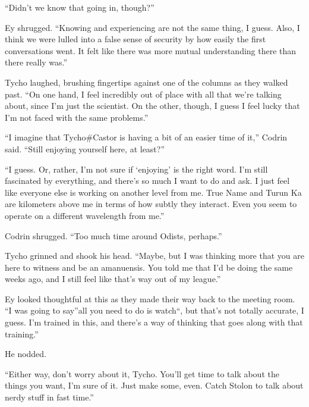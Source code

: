 ``Didn't we know that going in, though?''

Ey shrugged. ``Knowing and experiencing are not the same thing, I guess. Also, I think we were lulled into a false sense of security by how easily the first conversations went. It felt like there was more mutual understanding there than there really was.''

Tycho laughed, brushing fingertips against one of the columns as they walked past. ``On one hand, I feel incredibly out of place with all that we're talking about, since I'm just the scientist. On the other, though, I guess I feel lucky that I'm not faced with the same problems.''

``I imagine that Tycho\#Castor is having a bit of an easier time of it,'' Codrin said. ``Still enjoying yourself here, at least?''

``I guess. Or, rather, I'm not sure if `enjoying' is the right word. I'm still fascinated by everything, and there's so much I want to do and ask. I just feel like everyone else is working on another level from me. True Name and Turun Ka are kilometers above me in terms of how subtly they interact. Even you seem to operate on a different wavelength from me.''

Codrin shrugged. ``Too much time around Odists, perhaps.''

Tycho grinned and shook his head. ``Maybe, but I was thinking more that you are here to witness and be an amanuensis. You told me that I'd be doing the same weeks ago, and I still feel like that's way out of my league.''

Ey looked thoughtful at this as they made their way back to the meeting room. ``I was going to say''all you need to do is watch``, but that's not totally accurate, I guess. I'm trained in this, and there's a way of thinking that goes along with that training.''

He nodded.

``Either way, don't worry about it, Tycho. You'll get time to talk about the things you want, I'm sure of it. Just make some, even. Catch Stolon to talk about nerdy stuff in fast time.''
